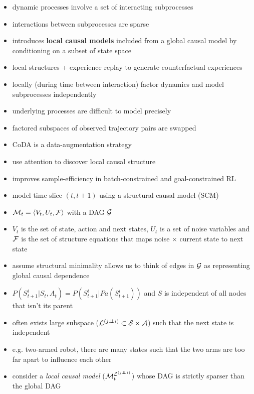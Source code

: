 \begin{itemize}
  \item dynamic processes involve a set of interacting subprocesses
  \item interactions between subprocesses are sparse
  \item introduces \textbf{local causal models} included from a global causal model by conditioning on a subset of state space
  \item local structures + experience replay to generate counterfactual experiences
  \item locally (during time between interaction) factor dynamics and model subprocesses independently
  \item underlying processes are difficult to model precisely
  \item factored subspaces of observed trajectory pairs are swapped
  \item CoDA is a data-augmentation strategy
  \item use attention to discover local causal structure
  \item improves sample-efficiency in batch-constrained and goal-constrained RL
  \item model time slice $(t, t+1)$ using a structural causal model (SCM)
  \item $\mathcal{M}_{t} = \langle V_{t}, U_{t}, \mathcal{F} \rangle$ with a DAG $\mathcal{G}$
  \item $V_{t}$ is the set of state, action and next states, $U_{t}$ is a set of noise variables and $\mathcal{F}$ is the set of structure equations that maps noise $\times$ current state to next state
  \item assume structural minimality allows us to think of edges in $\mathcal{G}$ as representing global causal dependence
  \item $P(S_{t+1}^{i}|S_{t}, A_{t}) = P(S_{t+1}^{i}|Pa(S_{t+1}^{i}))$ and $S$ is independent of all nodes that isn't its parent
  \item often exists large subspace ($\mathcal{L}^{(j \perp \!\!\! \perp  i)} \subset \mathcal{S} \times \mathcal{A}$) such that the next state is independent
  \item e.g. two-armed robot, there are many states such that the two arms are too far apart to influence each other
  \item consider a \textit{local causal model} ($\mathcal{M}_{t}^{\mathcal{L}^{(j \perp \!\!\! \perp i)}}$) whose DAG is strictly sparser than the global DAG
  \begin{figure}[h]

\end{figure}
\end{itemize}
